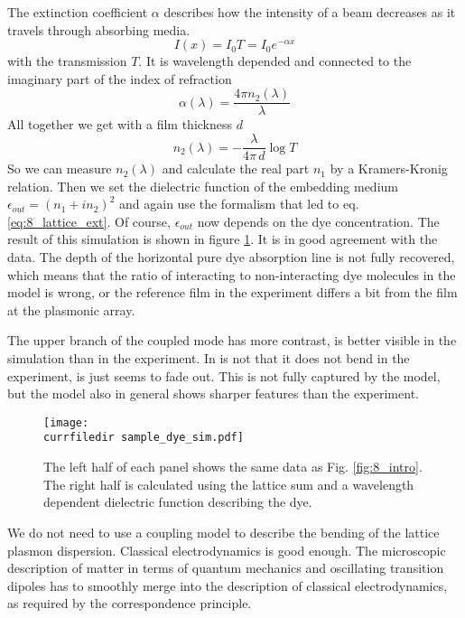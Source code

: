 The extinction coefficient $\alpha$ describes how the intensity of a beam decreases as it travels through absorbing media.
\begin{equation}
  I(x) = I_0 T = I_0 e^{- \alpha x}
\end{equation}
with the transmission $T$.
It is wavelength depended and connected to the imaginary part of the index of refraction 
\begin{equation}
  \alpha(\lambda) = \frac{4 \pi n_2(\lambda)}{ \lambda}
\end{equation}
All together we get with a film thickness $d$
\begin{equation}
  n_2(\lambda) = - \frac{\lambda}{4 \pi \, d} \log T
\end{equation}
So we can measure $n_2(\lambda)$ and calculate the real part $n_1$ by a Kramers-Kronig relation. Then we set the dielectric function of the embedding medium $\epsilon_{out} = (n_1 + i n_2)^2$ and again use the formalism that led to eq. \ref{eq:8_lattice_ext}. Of course, $\epsilon_{out}$ now depends on the dye concentration.  The result of this simulation is shown in figure 
\ref{fig:8_sample_dye_sim}. It is in good agreement with the data. The depth of the horizontal pure dye absorption line is not fully recovered, which means that the ratio of interacting to non-interacting dye molecules in the model is wrong, or the reference film in the experiment differs a bit from the film at the plasmonic array.

The upper branch of the coupled mode has more contrast, is better visible in the simulation than in the experiment. In is not that it does not bend in the experiment, is just seems to fade out. This is not fully captured by the model, but the model also in general shows sharper features than the experiment.

  \begin{figure}
    \texttt{[image: \\currfiledir sample\_dye\_sim.pdf]}
    \caption{The left half of each panel shows the same data as Fig. \ref{fig:8_intro}. The right half is calculated using the lattice sum and a wavelength dependent dielectric function describing the dye.\label{fig:8_sample_dye_sim} }
  \end{figure}
    
We do not need to use a coupling model to describe the bending of the lattice plasmon dispersion. Classical electrodynamics is good enough. The microscopic description of matter in terms of quantum mechanics and oscillating transition dipoles has to smoothly merge into the description of classical electrodynamics, as required by the correspondence principle.






\printbibliography[segment=\therefsegment,heading=subbibliography]




